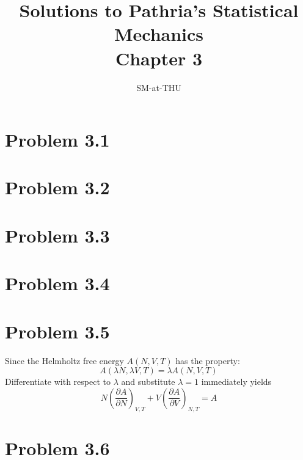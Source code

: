 \documentclass{article}
\author{SM-at-THU}
\title{\bf{Solutions to Pathria's Statistical Mechanics}\\Chapter 3}
\begin{document}
\maketitle

\section*{Problem 3.1}

\section*{Problem 3.2}

\section*{Problem 3.3}

\section*{Problem 3.4}

\section*{Problem 3.5}
	Since the Helmholtz free energy $A(N,V,T)$ has the property:
	\begin{equation*}
		A(\lambda N,\lambda V,T) = \lambda A(N,V,T)
	\end{equation*}
	Differentiate with respect to $\lambda$ and substitute $\lambda=1$ immediately yields
	\begin{equation*}
		N\left( \frac{ \partial A }{\partial N} \right)_{V,T}+V \left( \frac{ \partial A }{\partial V} \right)_{N,T} = A
	\end{equation*}

\section*{Problem 3.6}
\end{document}
